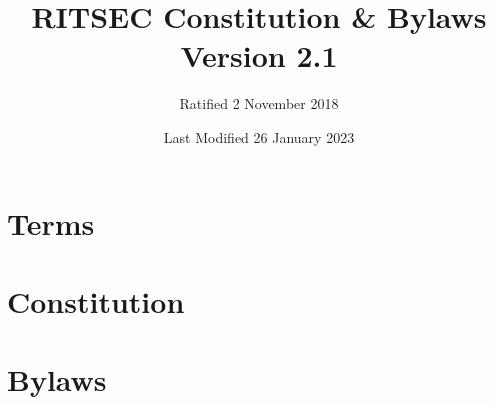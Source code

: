 \documentclass{constitution}
\title{RITSEC Constitution \& Bylaws\\ Version 2.1}
\author{Ratified 2 November 2018}
\date{Last Modified 26 January 2023}
\begin{document}
\maketitle
\newpage

\part{Terms}



\newpage

\part{Constitution}












\newpage


\part{Bylaws}




\end{document}
